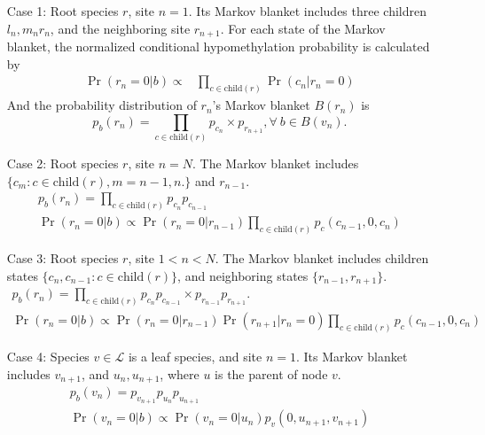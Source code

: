 \documentclass[11pt]{article}
\theoremstyle{theorem}
\theoremstyle{proposition}
\newcommand{\child}[1]{\ensuremath{\mathrm{child}(#1)}}
\begin{document}
\begin{enumerate}
\item[Case 1:] Root species $r$, site $n=1$. Its Markov blanket
includes three children $l_{n},m_{n} r_{n}$, and the neighboring site
$r_{n+1}$. For each state of the Markov blanket, the normalized
conditional hypomethylation probability is calculated by
\begin{equation*}
  \begin{aligned}
   \Pr(r_{n} = 0|b) \propto & \prod_{c \in \child{r}}\Pr(c_{n}| r_{n} = 0)
  \end{aligned}
\end{equation*}
And the probability distribution of $r_n$'s Markov blanket $B(r_{n})$ is
\[
p_{b}(r_{n}) = \prod_{c \in \child{r}}p_{c_{n}}\times p_{r_{n+1}}, \forall~b\in B(v_{n}).
\]

\item[Case 2:] Root species $r$, site $n=N$. The
Markov blanket includes $\{c_{m}: c\in \child{r}, m=n-1, n.\}$ and $r_{n-1}$.
\begin{gather*}
p_b(r_n) = \prod_{c \in \child{r}}p_{c_{n}} p_{c_{n-1}} \\
\Pr(r_{n} = 0|b) \propto \Pr(r_{n} = 0| r_{n-1})\prod_{c \in \child{r}}p_c(c_{n-1}, 0, c_{n})
\end{gather*}
\item[Case 3:] Root species $r$, site $1< n < N$. The Markov
blanket includes children states $\{c_{n},c_{n-1}: c\in
\child{r}\}$, and neighboring states $\{r_{n-1}, r_{n+1}\}$.
\begin{gather*}
p_b(r_n) = \prod_{c\in \child{r}} p_{c_{n}}p_{c_{n-1}}\times
p_{r_{n-1}}p_{r_{n+1}}. \\
\Pr(r_{n} = 0|b) \propto \Pr(r_{n} = 0| r_{n-1})
    \Pr(r_{n+1}|r_{n} = 0)\prod_{c \in \child{r}}p_c(c_{n-1}, 0, c_n)
\end{gather*}
\item[Case 4:] Species $v\in \mathcal{L}$ is a leaf species, and site
$n=1$.  Its Markov blanket includes $v_{n+1}$, and $u_{n}, u_{n+1}$,
where $u$ is the parent of node $v$.
\begin{gather*}
p_b(v_n) = p_{v_{n+1}}p_{u_{n}}p_{ u_{n+1}}\\
\Pr(v_{n} = 0|b)
  \propto \Pr(v_{n} = 0| u_{n}) p_v(0, u_{n+1}, v_{n+1})
\end{gather*}


\end{enumerate}
\end{document}
